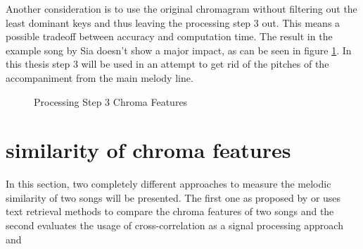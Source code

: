 Another consideration is to use the original chromagram without filtering out the least dominant keys and thus leaving the processing step 3 out. This means a possible tradeoff between accuracy and computation time. The result in the example song by Sia doesn't show a major impact, as can be seen in figure \ref{fig:nomax}. In this thesis step 3 will be used in an attempt to get rid of the pitches of the accompaniment from the main melody line.
\begin{figure}[htbp]
	\centering
	\caption{Processing Step 3 Chroma Features}
	\label{fig:nomax}
\end{figure}

\section{similarity of chroma features}
In this section, two completely different approaches to measure the melodic similarity of two songs will be presented. The first one as proposed by \cite{chroma1} or \cite{chroma4} uses text retrieval methods to compare the chroma features of two songs and the second evaluates the usage of cross-correlation as a signal processing approach \cite{chroma2} and \cite{chroma3}

